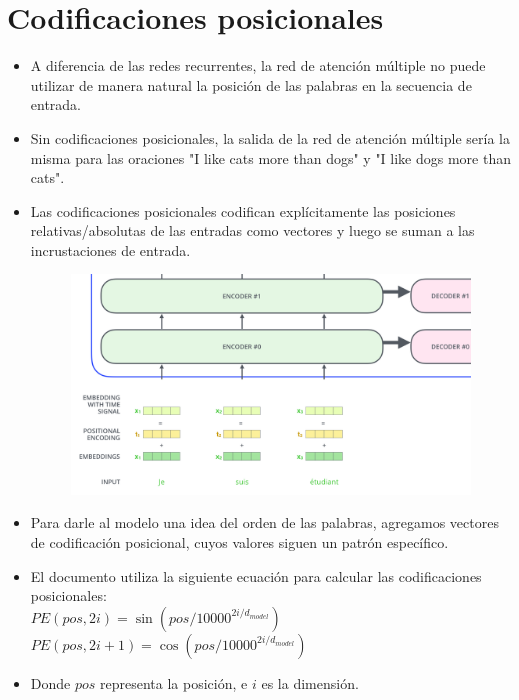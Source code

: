 \section{Codificaciones posicionales}

\begin{itemize}
\item A diferencia de las redes recurrentes, la red de atención múltiple no puede utilizar de manera natural la posición de las palabras en la secuencia de entrada.

\item Sin codificaciones posicionales, la salida de la red de atención múltiple sería la misma para las oraciones "I like cats more than dogs" y "I like dogs more than cats".

\item Las codificaciones posicionales codifican explícitamente las posiciones relativas/absolutas de las entradas como vectores y luego se suman a las incrustaciones de entrada.

\begin{figure}[h]
  \centering
  \includegraphics[scale=0.2]{pics/transformer_positional_encoding_vectors.png}
\end{figure}

\item Para darle al modelo una idea del orden de las palabras, agregamos vectores de codificación posicional, cuyos valores siguen un patrón específico.

\item El documento utiliza la siguiente ecuación para calcular las codificaciones posicionales:\\
$PE(pos,2i) = \sin(pos/10000^{2i/d_{model}})$
$PE(pos,2i+1) = \cos(pos/10000^{2i/d_{model}})$

\item Donde $pos$ representa la posición, e $i$ es la dimensión.


\end{itemize}
